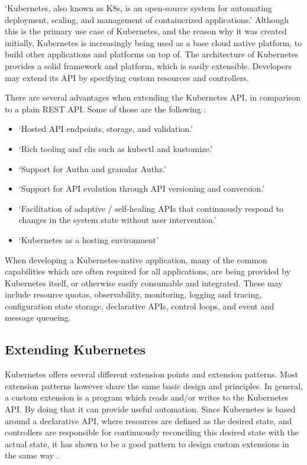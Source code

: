 \enquote*{Kubernetes, also known as K8s, is an open-source system for automating deployment, scaling, and management of containerized applications.}
\autocite{kubernetesIoWebsite}
Although this is the primary use case of Kubernetes,
and the reason why it was created initially,
Kubernetes is increasingly being used as a base cloud native platform,
to build other applications and platforms on top of.
The architecture of Kubernetes provides a solid framework and platform,
which is easily extensible.
Developers may extend its API by specifying custom resources and controllers.

There are several advantages when extending the Kubernetes API,
in comparison to a plain REST API.
Some of those are the following
\autocite{kubebuilderBookWebsite}:

\begin{itemize}
	\item \enquote*{Hosted API endpoints, storage, and validation.}
	\item \enquote*{Rich tooling and clis such as kubectl and kustomize.}
	\item \enquote*{Support for Authn and granular Authz.}
	\item \enquote*{Support for API evolution through API versioning and conversion.}
	\item \enquote*{Facilitation of adaptive / self-healing APIs that continuously respond to changes in the system state without user intervention.}
	\item \enquote*{Kubernetes as a hosting environment}
	\autocite{kubebuilderBookWebsite}
\end{itemize}

When developing a Kubernetes-native application,
many of the common capabilities which are often required for all applications,
are being provided by Kubernetes itself, or otherwise easily consumable and integrated.
These may include resource quotas, observability, monitoring, logging and tracing,
configuration state storage, declarative APIs, control loops, and event and message queueing.

\subsection*{Extending Kubernetes}
Kubernetes offers several different extension points and extension patterns.
Most extension patterns however share the same basic design and principles.
In general, a custom extension is a program which reads and/or writes
to the Kubernetes API. By doing that it can provide useful automation.
Since Kubernetes is based around a declarative API,
where resources are defined as the desired state,
and controllers are responsible for continuously reconciling this
desired state with the actual state,
it has shown to be a good pattern to design custom extensions in the same way
\autocite{extendKubernetes}.


